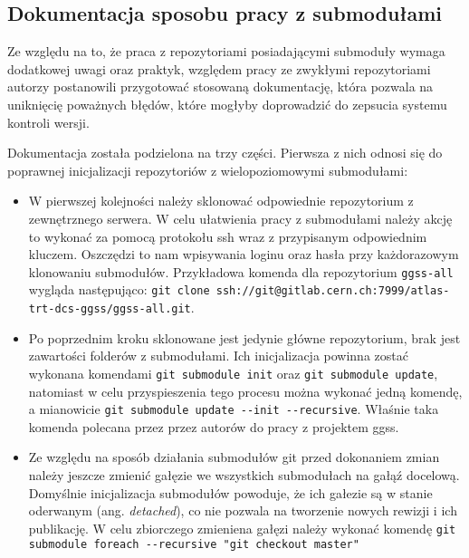 \subsection{Dokumentacja sposobu pracy z submodułami}

Ze względu na to, że praca z repozytoriami posiadającymi submoduły wymaga dodatkowej uwagi oraz praktyk, względem pracy ze zwykłymi repozytoriami autorzy postanowili przygotować stosowaną dokumentację, która pozwala na uniknięcię poważnych błędów, które mogłyby doprowadzić do zepsucia systemu kontroli wersji.

Dokumentacja została podzielona na trzy części. Pierwsza z nich odnosi się do poprawnej inicjalizacji repozytoriów z wielopoziomowymi submodułami:
\begin{itemize}
    \item W pierwszej kolejności należy sklonować odpowiednie repozytorium z zewnętrznego serwera. W celu ułatwienia pracy z submodułami należy akcję to wykonać za pomocą protokołu ssh wraz z przypisanym odpowiednim kluczem. Oszczędzi to nam wpisywania loginu oraz hasła przy każdorazowym klonowaniu submodułów. Przykładowa komenda dla repozytorium \lstinline{ggss-all} wygląda następująco: \lstinline{git clone ssh://git@gitlab.cern.ch:7999/atlas-trt-dcs-ggss/ggss-all.git}.
    \item Po poprzednim kroku sklonowane jest jedynie główne repozytorium, brak jest zawartości folderów z submodułami. Ich inicjalizacja powinna zostać wykonana komendami \lstinline{git submodule init} oraz \lstinline{git submodule update}, natomiast w celu przyspieszenia tego procesu można wykonać jedną komendę, a mianowicie \lstinline{git submodule update --init --recursive}. Właśnie taka komenda polecana przez przez autorów do pracy z projektem ggss.
    \item Ze względu na sposób działania submodułów git przed dokonaniem zmian należy jeszcze zmienić gałęzie we wszystkich submodułach na gałąź docelową. Domyślnie inicjalizacja submodułów powoduje, że ich gałezie są w stanie oderwanym (ang. \emph{detached}), co nie pozwala na tworzenie nowych rewizji i ich publikację. W celu zbiorczego zmieniena gałęzi należy wykonać komendę \lstinline{git submodule foreach --recursive "git checkout master"}
\end{itemize}

